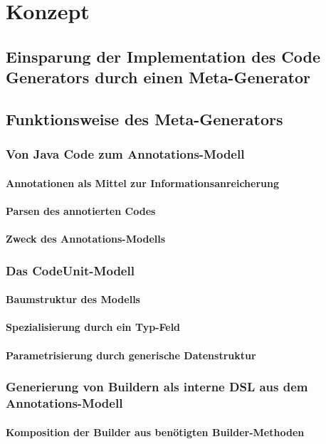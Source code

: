 \documentclass[12pt,oneside,a4paper,parskip]{scrbook}
\begin{document}
\chapter{Konzept}
\section{Einsparung der Implementation des Code Generators durch einen Meta-Generator}
\section{Funktionsweise des Meta-Generators}
\subsection{Von Java Code zum Annotations-Modell}
\subsubsection{Annotationen als Mittel zur Informationsanreicherung}
\subsubsection{Parsen des annotierten Codes}
\subsubsection{Zweck des Annotations-Modells}
\subsection{Das CodeUnit-Modell}
\subsubsection{Baumstruktur des Modells}
\subsubsection{Spezialisierung durch ein Typ-Feld}
\subsubsection{Parametrisierung durch generische Datenstruktur}
\subsection{Generierung von Buildern als interne DSL aus dem Annotations-Modell}
\subsubsection{Komposition der Builder aus benötigten Builder-Methoden}
\end{document}

